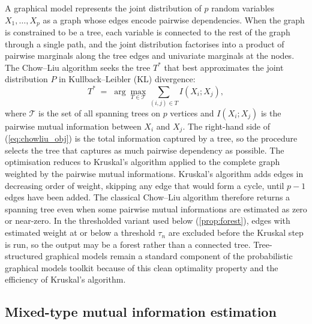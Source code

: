 A graphical model represents the joint distribution of $p$ random
variables $X_1, \ldots, X_p$ as a graph whose edges encode pairwise
dependencies. When the graph is constrained to be a tree, each
variable is connected to the rest of the graph through a single path,
and the joint distribution factorises into a product of pairwise
marginals along the tree edges and univariate marginals at the
nodes. The Chow--Liu algorithm seeks the tree $T^*$ that best
approximates the joint distribution $P$ in Kullback--Leibler (KL)
divergence:
\begin{equation}
T^* \;=\; \arg\max_{T \in \mathcal{T}} \sum_{(i,j) \in T} I(X_i; X_j),
\label{eq:chowliu_obj}
\end{equation}
where $\mathcal{T}$ is the set of all spanning trees on $p$ vertices
and $I(X_i; X_j)$ is the pairwise mutual information between $X_i$
and $X_j$. The right-hand side of (\ref{eq:chowliu_obj}) is the
total information captured by a tree, so the procedure selects the
tree that captures as much pairwise dependency as possible. The
optimisation reduces to Kruskal's algorithm
\citep{kruskal1956shortest} applied to the complete graph weighted
by the pairwise mutual informations. Kruskal's algorithm adds edges
in decreasing order of weight, skipping any edge that would form a
cycle, until $p - 1$ edges have been added. The classical Chow--Liu algorithm therefore
returns a spanning tree even when some pairwise mutual informations
are estimated as zero or near-zero. In the thresholded variant used
below (\cref{prop:forest}), edges with estimated weight at or below
a threshold $\tau_n$ are excluded before the Kruskal step is run, so
the output may be a forest rather than a connected tree.
Tree-structured graphical models remain a standard component of the
probabilistic graphical models toolkit
\citep{koller2009probabilistic} because of this clean optimality
property and the efficiency of Kruskal's algorithm.

\subsection{Mixed-type mutual information estimation}
\label{subsec:mi}

